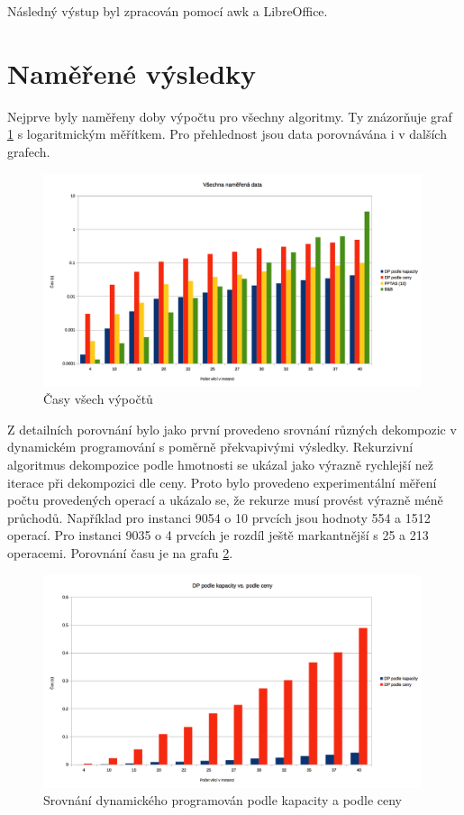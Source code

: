 \documentclass[a4paper]{article}
\begin{document}
	Následný výstup byl zpracován pomocí awk a LibreOffice.

\section{Naměřené výsledky}
	Nejprve byly naměřeny doby výpočtu pro všechny algoritmy. Ty znázorňuje graf \ref{all-times} s logaritmickým měřítkem. Pro přehlednost jsou data porovnávána i v dalších grafech.
	
	\begin{figure}[h]\centering
		\includegraphics[width=0.99\textwidth]{allData.png} 
		\caption{Časy všech výpočtů}
		\label{all-times}
	\end{figure}
	
	Z detailních porovnání bylo jako první provedeno srovnání různých dekompozic v dynamickém programování s poměrně překvapivými výsledky. Rekurzivní algoritmus dekompozice podle hmotnosti se ukázal jako výrazně rychlejší než iterace při dekompozici dle ceny.  Proto bylo provedeno experimentální měření počtu provedených operací a ukázalo se, že rekurze musí provést výrazně méně průchodů. Například pro instanci 9054 o 10 prvcích jsou hodnoty 554 a 1512 operací. Pro instanci 9035 o 4 prvcích je rozdíl ještě markantnější s 25 a 213 operacemi. Porovnání času je na grafu \ref{dynamic}.
	
	\begin{figure}[h]\centering
		\includegraphics[width=0.99\textwidth]{capVsValue.png}  
		\caption{Srovnání dynamického programován podle kapacity a podle ceny}
		\label{dynamic}
	\end{figure}
	
\end{document}
